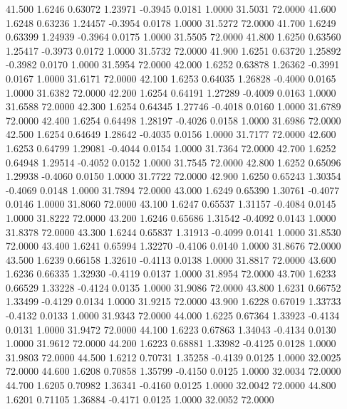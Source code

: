   41.500   1.6246   0.63072   1.23971  -0.3945   0.0181   1.0000  31.5031  72.0000
  41.600   1.6248   0.63236   1.24457  -0.3954   0.0178   1.0000  31.5272  72.0000
  41.700   1.6249   0.63399   1.24939  -0.3964   0.0175   1.0000  31.5505  72.0000
  41.800   1.6250   0.63560   1.25417  -0.3973   0.0172   1.0000  31.5732  72.0000
  41.900   1.6251   0.63720   1.25892  -0.3982   0.0170   1.0000  31.5954  72.0000
  42.000   1.6252   0.63878   1.26362  -0.3991   0.0167   1.0000  31.6171  72.0000
  42.100   1.6253   0.64035   1.26828  -0.4000   0.0165   1.0000  31.6382  72.0000
  42.200   1.6254   0.64191   1.27289  -0.4009   0.0163   1.0000  31.6588  72.0000
  42.300   1.6254   0.64345   1.27746  -0.4018   0.0160   1.0000  31.6789  72.0000
  42.400   1.6254   0.64498   1.28197  -0.4026   0.0158   1.0000  31.6986  72.0000
  42.500   1.6254   0.64649   1.28642  -0.4035   0.0156   1.0000  31.7177  72.0000
  42.600   1.6253   0.64799   1.29081  -0.4044   0.0154   1.0000  31.7364  72.0000
  42.700   1.6252   0.64948   1.29514  -0.4052   0.0152   1.0000  31.7545  72.0000
  42.800   1.6252   0.65096   1.29938  -0.4060   0.0150   1.0000  31.7722  72.0000
  42.900   1.6250   0.65243   1.30354  -0.4069   0.0148   1.0000  31.7894  72.0000
  43.000   1.6249   0.65390   1.30761  -0.4077   0.0146   1.0000  31.8060  72.0000
  43.100   1.6247   0.65537   1.31157  -0.4084   0.0145   1.0000  31.8222  72.0000
  43.200   1.6246   0.65686   1.31542  -0.4092   0.0143   1.0000  31.8378  72.0000
  43.300   1.6244   0.65837   1.31913  -0.4099   0.0141   1.0000  31.8530  72.0000
  43.400   1.6241   0.65994   1.32270  -0.4106   0.0140   1.0000  31.8676  72.0000
  43.500   1.6239   0.66158   1.32610  -0.4113   0.0138   1.0000  31.8817  72.0000
  43.600   1.6236   0.66335   1.32930  -0.4119   0.0137   1.0000  31.8954  72.0000
  43.700   1.6233   0.66529   1.33228  -0.4124   0.0135   1.0000  31.9086  72.0000
  43.800   1.6231   0.66752   1.33499  -0.4129   0.0134   1.0000  31.9215  72.0000
  43.900   1.6228   0.67019   1.33733  -0.4132   0.0133   1.0000  31.9343  72.0000
  44.000   1.6225   0.67364   1.33923  -0.4134   0.0131   1.0000  31.9472  72.0000
  44.100   1.6223   0.67863   1.34043  -0.4134   0.0130   1.0000  31.9612  72.0000
  44.200   1.6223   0.68881   1.33982  -0.4125   0.0128   1.0000  31.9803  72.0000
  44.500   1.6212   0.70731   1.35258  -0.4139   0.0125   1.0000  32.0025  72.0000
  44.600   1.6208   0.70858   1.35799  -0.4150   0.0125   1.0000  32.0034  72.0000
  44.700   1.6205   0.70982   1.36341  -0.4160   0.0125   1.0000  32.0042  72.0000
  44.800   1.6201   0.71105   1.36884  -0.4171   0.0125   1.0000  32.0052  72.0000
